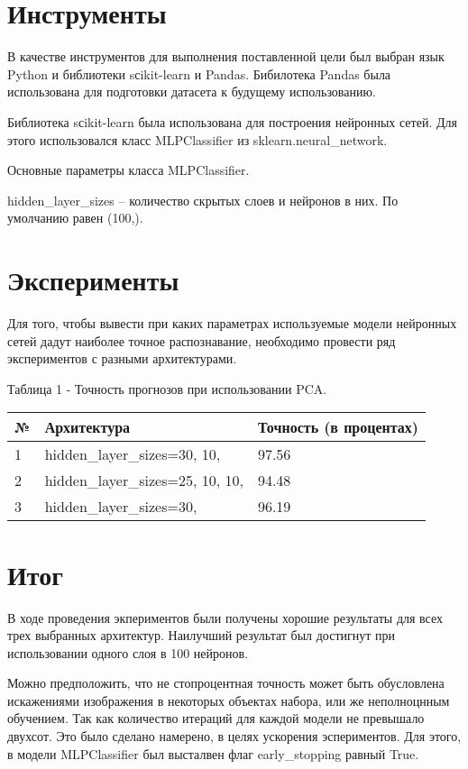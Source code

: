 \documentclass[a4paper,12pt]{article}
\begin{document}
	
\newpage\section{Инструменты} 
	В качестве инструментов для выполнения поставленной цели был выбран язык Python и библиотеки sсikit-learn и Pandas.
	Бибилотека Pandas была использована для подготовки датасета к будущему использованию.
	
	\vspace{0.5cm}
	Библиотека sсikit-learn была использована для построения нейронных сетей. Для этого использовался класс MLPClassifier из sklearn.neural\_network.
	
	\vspace{0.5cm}
	Основные параметры класса MLPClassifier.
	
	\vspace{0.5cm}
	hidden\_layer\_sizes – количество скрытых слоев и нейронов в них. По умолчанию равен (100,).

	
\newpage\section{Эксперименты}
	Для того, чтобы вывести при каких параметрах используемые модели нейронных сетей дадут наиболее точное распознавание, необходимо провести ряд экспериментов с разными архитектурами. 

	\vspace{0.5cm}
	Таблица 1 - Точность прогнозов  при использовании PCA.
\begin{longtable}{|p{1cm}|p{9cm}|p{3cm}|}
\hline
№ & Архитектура & Точность (в процентах) \\ 
\hline 
1 & hidden\_layer\_sizes=30, 10, & 97.56 \\
\hline
2 & hidden\_layer\_sizes=25, 10, 10,  & 94.48 \\
\hline 
3 & hidden\_layer\_sizes=30, & 96.19 \\
\hline
\end{longtable}


\newpage\section{Итог}
	В ходе проведения экпериментов были получены хорошие результаты для всех трех выбранных архитектур. Наилучший результат был достигнут при использовании одного слоя в 100 нейронов. 
	
	\vspace{0.5cm}
	Можно предположить, что не стопроцентная точность может быть обусловлена искажениями изображения в некоторых объектах  набора, или же неполноцнным обучением. Так как количество итераций для каждой модели не превышало двухсот. Это было сделано намерено, в целях ускорения эспериментов. Для этого, в модели MLPClassifier был высталвен флаг early\_stopping равный True.
	
	
\end{document}
